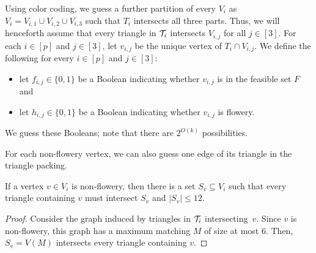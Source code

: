 Using color coding, we guess
a further partition of every $V_i$ as $V_i=V_{i,1} \cup V_{i,2} \cup V_{i,3}$ such that $T_i$ intersects all three parts.
Thus, we will henceforth assume that every triangle in $\mathcal T_i$ intersects $V_{i,j}$ for all $j \in [3]$.
For each $i \in [p]$ and $j \in [3]$, let $v_{i,j}$ be the unique vertex of $T_i \cap V_{i,j}$.
We define the following for every $i \in [p]$ and $j \in [3]$:
\begin{itemize}
\item let $f_{i,j} \in \{ 0, 1 \}$ be a Boolean indicating whether $v_{i,j}$ is in the feasible set $F$ and
\item let $h_{i,j} \in \{ 0, 1 \}$ be a Boolean indicating whether $v_{i,j}$ is flowery.
\end{itemize}
We guess these Booleans; note that there are $2^{O(k)}$ possibilities.

For each non-flowery vertex, we can also guess one edge of its triangle in the triangle packing. 

\begin{lemma} \label{lemma:small-vc}
  If a vertex $v \in V_i$ is non-flowery, then there is a set $S_v \subseteq V_i$
  such that every triangle containing $v$ must intersect $S_v$ and $|S_v| \le 12$.
\end{lemma}
\begin{proof}
  Consider the graph induced by
  triangles in $\mathcal T_i$ intersecting~$v$.
  Since $v$ is non-flowery, this graph has a maximum matching $M$ of size at most 6.
  Then, $S_v = V(M)$ intersects every triangle containing $v$.
\end{proof}

